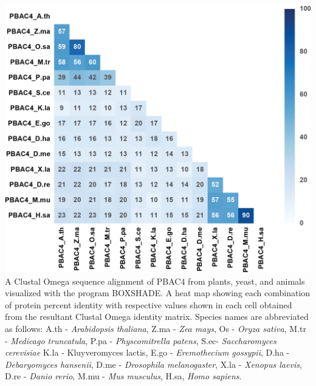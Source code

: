 \begin{FPfigure}
	\ContinuedFloat
	\centering
	\includegraphics[width=\columnwidth]{Proteasome/pbac4align2.png}
	{A Clustal Omega \citep{sievers14} sequence alignment of PBAC4 from plants, yeast, and animals visualized with the program BOXSHADE. A heat map showing each combination of protein percent identity with respective values shown in each cell obtained from the resultant Clustal Omega identity matrix. Species names are abbreviated as follows: A.th - \textit{Arabidopsis thaliana}, Z.ma - \textit{Zea mays}, Os - \textit{Oryza sativa}, M.tr - \textit{Medicago truncatula}, P.pa - \textit{Physcomitrella patens}, S.ec- \textit{Saccharomyces cerevisiae} K.la - {Kluyveromyces lactis}, E.go - \textit{Eremothecium gossypii}, D.ha - \textit{Debaryomyces hansenii}, D.me - \textit{Drosophila melanogaster}, X.la - \textit{Xenopus laevis}, D.re - \textit{Danio rerio}, M.mu - \textit{Mus musculus}, H.sa, \textit{Homo sapiens}.}
	\label{fig:pbac4align2}
\end{FPfigure}
\clearpage
